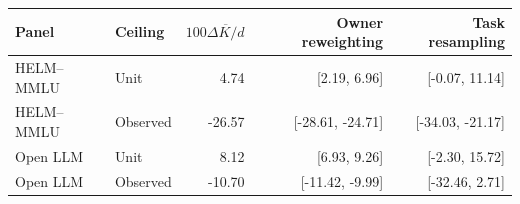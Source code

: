 \begin{tabular}{llrrr}
\toprule
Panel & Ceiling & $100\overline{\Delta K/d}$ & Owner reweighting & Task resampling \\
\midrule
HELM--MMLU & Unit & 4.74 & [2.19, 6.96] & [-0.07, 11.14] \\
HELM--MMLU & Observed & -26.57 & [-28.61, -24.71] & [-34.03, -21.17] \\
Open LLM & Unit & 8.12 & [6.93, 9.26] & [-2.30, 15.72] \\
Open LLM & Observed & -10.70 & [-11.42, -9.99] & [-32.46, 2.71] \\
\bottomrule
\end{tabular}
